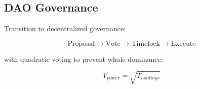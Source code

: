 \subsection{DAO Governance}

Transition to decentralized governance:

\begin{equation}
\text{Proposal} \rightarrow \text{Vote} \rightarrow \text{Timelock} \rightarrow \text{Execute}
\end{equation}

with quadratic voting to prevent whale dominance:

\begin{equation}
V_{power} = \sqrt{T_{holdings}}
\end{equation}

